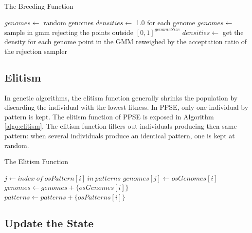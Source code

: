 \documentclass[10pt,letterpaper]{article}
\theoremstyle{definition}
\theoremstyle{remark}
\begin{document}
\begin{algorithm}
    \caption{The Breeding Function}
    \label{algo:breeding}
    \begin{algorithmic}[1]
        \State $genomes \gets$ random genomes
        \State $densities \gets$ 1.0 for each genome
        \Else
        \State $genomes \gets$ sample in gmm rejecting the points outside $[0, 1]^{genomeSize}$
        \State $densities \gets$ get the density for each genome point in the GMM reweighed by the acceptation ratio of the rejection sampler 
        \EndIf
        \State {}
    \EndFunction    
    \end{algorithmic}
\end{algorithm}


\subsection*{Elitism}

In genetic algorithms, the elitism function generally shrinks the population by discarding the individual with the lowest fitness.
In PPSE, only one individual by pattern is kept. 
The elitism function of PPSE is exposed in Algorithm \ref{algo:elitism}. 
The elitism function filters out individuals producing then same pattern: when several individuals produce an identical pattern, one is kept at random.

\begin{algorithm}
    \caption{The Elitism Function}
    \label{algo:elitism}
    \begin{algorithmic}[1]
        \State $j \gets index\ of\ osPattern[i]\ in\ patterns$
        \State $genomes[j] \gets osGenomes[i]$
      \EndIf
    \Else
    \State $genomes \gets genomes + \{osGenomes[i]\}$
    \State $patterns \gets patterns + \{osPatterns[i]\}$
    \EndIf
    \EndFor
    \State {}
    \EndFunction
    \end{algorithmic}
\end{algorithm}


\subsection{Update the State}
\end{document}
